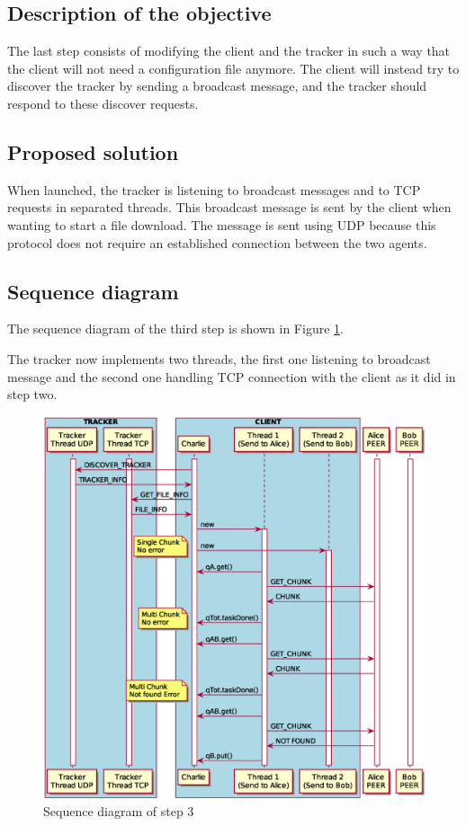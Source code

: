 \subsection{Description of the objective}

The last step consists of modifying the client and the tracker in such a way that the client will not need a configuration file anymore. The client will instead try to discover the tracker by sending a broadcast message, and the tracker should respond to these discover requests.

\subsection{Proposed solution}

When launched, the tracker is listening to broadcast messages and to TCP requests in separated threads. This broadcast message is sent by the client when wanting to start a file download. The message is sent using UDP because this protocol does not require an established connection between the two agents.

\subsection{Sequence diagram}

The sequence diagram of the third step is shown in Figure \ref{fig:step3}.

The tracker now implements two threads, the first one listening to broadcast message and the second one handling TCP connection with the client as it did in step two.

\begin{figure}
	\centering
	\includegraphics[width=\textwidth]{img/step3.eps}
	\caption{Sequence diagram of step 3}
	\label{fig:step3}
\end{figure}